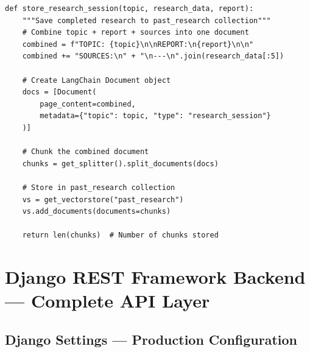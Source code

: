 \documentclass[11pt,a4paper,twoside]{report}
\begin{document}
\begin{lstlisting}[style=pythonstyle]
def store_research_session(topic, research_data, report):
    """Save completed research to past_research collection"""
    # Combine topic + report + sources into one document
    combined = f"TOPIC: {topic}\n\nREPORT:\n{report}\n\n"
    combined += "SOURCES:\n" + "\n---\n".join(research_data[:5])

    # Create LangChain Document object
    docs = [Document(
        page_content=combined,
        metadata={"topic": topic, "type": "research_session"}
    )]

    # Chunk the combined document
    chunks = get_splitter().split_documents(docs)

    # Store in past_research collection
    vs = get_vectorstore("past_research")
    vs.add_documents(documents=chunks)

    return len(chunks)  # Number of chunks stored
\end{lstlisting}



\chapter{Django REST Framework Backend --- Complete API Layer}

\section{Django Settings --- Production Configuration}
\end{document}
